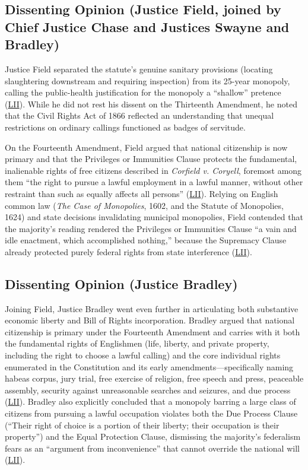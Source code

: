 \documentclass[12pt]{article}
\begin{document}
\subsection{Dissenting Opinion (Justice Field, joined by Chief Justice Chase and Justices Swayne and Bradley)}

Justice Field separated the statute's genuine sanitary provisions (locating slaughtering downstream and requiring inspection) from its 25-year monopoly, calling the public-health justification for the monopoly a ``shallow'' pretence (\href{https://www.law.cornell.edu/supremecourt/text/83/36}{LII}). While he did not rest his dissent on the Thirteenth Amendment, he noted that the Civil Rights Act of 1866 reflected an understanding that unequal restrictions on ordinary callings functioned as badges of servitude.

On the Fourteenth Amendment, Field argued that national citizenship is now primary and that the Privileges or Immunities Clause protects the fundamental, inalienable rights of free citizens described in \textit{Corfield v. Coryell}, foremost among them ``the right to pursue a lawful employment in a lawful manner, without other restraint than such as equally affects all persons'' (\href{https://www.law.cornell.edu/supremecourt/text/83/36}{LII}). Relying on English common law (\textit{The Case of Monopolies}, 1602, and the Statute of Monopolies, 1624) and state decisions invalidating municipal monopolies, Field contended that the majority's reading rendered the Privileges or Immunities Clause ``a vain and idle enactment, which accomplished nothing,'' because the Supremacy Clause already protected purely federal rights from state interference (\href{https://www.law.cornell.edu/supremecourt/text/83/36}{LII}).

\subsection{Dissenting Opinion (Justice Bradley)}

Joining Field, Justice Bradley went even further in articulating both substantive economic liberty and Bill of Rights incorporation. Bradley argued that national citizenship is primary under the Fourteenth Amendment and carries with it both the fundamental rights of Englishmen (life, liberty, and private property, including the right to choose a lawful calling) and the core individual rights enumerated in the Constitution and its early amendments---specifically naming habeas corpus, jury trial, free exercise of religion, free speech and press, peaceable assembly, security against unreasonable searches and seizures, and due process (\href{https://www.law.cornell.edu/supremecourt/text/83/36}{LII}). Bradley also explicitly concluded that a monopoly barring a large class of citizens from pursuing a lawful occupation violates both the Due Process Clause (``Their right of choice is a portion of their liberty; their occupation is their property'') and the Equal Protection Clause, dismissing the majority's federalism fears as an ``argument from inconvenience'' that cannot override the national will (\href{https://www.law.cornell.edu/supremecourt/text/83/36}{LII}).
\end{document}
